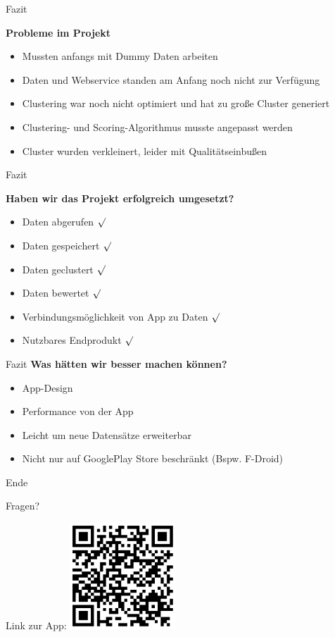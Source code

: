 \documentclass[compress,t]{beamer}
\begin{document}
\begin{frame}{Fazit}

    \textbf{Probleme im Projekt}
     \begin{itemize}
          \item Mussten anfangs mit Dummy Daten arbeiten
          \item Daten und Webservice standen am Anfang noch nicht zur Verfügung
          \item Clustering war noch nicht optimiert und hat zu große Cluster generiert
          \item Clustering- und Scoring-Algorithmus musste angepasst werden
          \item Cluster wurden verkleinert, leider mit Qualitätseinbußen
    \end{itemize}

\end{frame}
\begin{frame}{Fazit}

    \textbf{Haben wir das Projekt erfolgreich umgesetzt?}
     \begin{itemize}
          \item Daten abgerufen \(\surd\)
          \item Daten gespeichert \(\surd\)
          \item Daten geclustert \(\surd\)
          \item Daten bewertet \(\surd\)
          \item Verbindungsmöglichkeit von App zu Daten \(\surd\){}
          \item Nutzbares Endprodukt \(\surd\)
    \end{itemize}

\end{frame}
\begin{frame}{Fazit}
    \textbf{Was hätten wir besser machen können?}
    \begin{itemize}
        \item App-Design
        \item Performance von der App
        \item Leicht um neue Datensätze erweiterbar
        \item Nicht nur auf GooglePlay Store beschränkt (Bspw. F-Droid)
    \end{itemize}
\end{frame}
\begin{frame}{Ende}

    \Huge
    {Fragen?}

    \normalsize
    Link zur App:
    \center
    \includegraphics[width=0.3\textwidth]{img/qrcode.png}
\end{frame}
\end{document}
